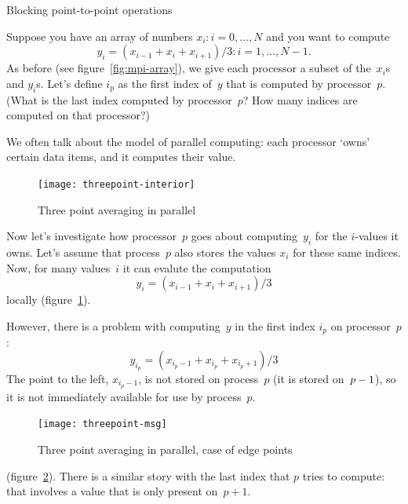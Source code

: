 
 {Blocking point-to-point operations}

Suppose you have an array of numbers $x_i\colon i=0,\ldots,N$
and you want to compute
\[ y_i=(x_{i-1}+x_i+x_{i+1})/3\colon i=1,\ldots,N-1. \]
As before (see figure~\ref{fig:mpi-array}), we give each processor
a subset of the~$x_i$s and $y_i$s.
Let's define $i_p$ as the first index of~$y$ that is
computed by processor~$p$. (What is the last index computed by processor~$p$?
How many indices are computed on that processor?)

We often talk about the 
model of parallel computing: each processor `owns' certain data items,
and it computes their value.

\begin{figure}[t]
  \texttt{[image: threepoint-interior]}
  \caption{Three point averaging in parallel}
  \label{fig:3pt-interior}
\end{figure}
%
Now let's investigate how processor~$p$ goes about computing~$y_i$ for
the $i$-values it owns. Let's assume that process~$p$ also stores
the values $x_i$ for these same indices.
Now, for many values~$i$ it can evalute the computation
\[ y_{i} = (x_{i-1}+x_{i}+x_{i+1})/3 \]
locally (figure~\ref{fig:3pt-interior}).

However, there is a problem with computing~$y$
in the first index $i_p$ on processor~$p$:
\[ y_{i_p} = (x_{i_p-1}+x_{i_p}+x_{i_p+1})/3 \]
The point to the left, $x_{i_p-1}$,
is not stored on process~$p$
(it is stored on~$p-\nobreak1$),
so it is not immediately available for use by process~$p$.
%
\begin{figure}[t]
  \texttt{[image: threepoint-msg]}
  \caption{Three point averaging in parallel, case of edge points}
  \label{fig:3pt-msg}
\end{figure}
%
(figure~\ref{fig:3pt-msg}).
There is a similar story with the last index that $p$ tries to compute:
that involves a value that is only present on~$p+1$.

